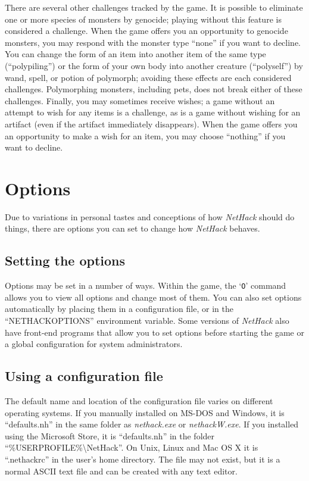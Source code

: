 There are several other challenges tracked by the game.  It is possible
to eliminate one or more species of monsters by genocide; playing without
this feature is considered a challenge.  When the game offers you an
opportunity to genocide monsters, you may respond with the monster type
``none'' if you want to decline.  You can change the form of an item into
another item of the same type (``polypiling'') or the form of your own
body into another creature (``polyself'') by wand, spell, or potion of
polymorph; avoiding these effects are each considered challenges.
Polymorphing monsters, including pets, does not break either of these
challenges.
Finally, you may sometimes receive wishes; a game without an attempt to
wish for any items is a challenge, as is a game without wishing for
an artifact (even if the artifact immediately disappears).  When the
game offers you an opportunity to make a wish for an item, you may
choose ``nothing'' if you want to decline.

\section{Options}

Due to variations in personal tastes and conceptions of how {\it NetHack\/}
should do things, there are options you can set to change how {\it NetHack\/}
behaves.

\subsection*{Setting the options}

Options may be set in a number of ways.  Within the game, the `{\tt O}'
command allows you to view all options and change most of them.
You can also set options automatically by placing them in a configuration
file, or in the ``NETHACKOPTIONS'' environment variable.
Some versions of {\it NetHack\/} also have front-end programs that allow
you to set options before starting the game or a global configuration
for system administrators.

\subsection*{Using a configuration file}

The default name and location of the configuration file varies on different
operating systems. If you manually installed on MS-DOS and Windows,
it is \mbox{``defaults.nh''} in
the same folder as \mbox{{\it nethack.exe\/}} or \mbox{{\it nethackW.exe\/}}.
If you installed using the Microsoft Store, it is \mbox{``defaults.nh''} in
the folder \mbox{{``\%USERPROFILE\%\textbackslash NetHack''}}.
On Unix, Linux and Mac OS X it is \mbox{``.nethackrc''} in the user's home
directory. The file may not exist, but it is a normal ASCII text file and
can be created with any text editor.

